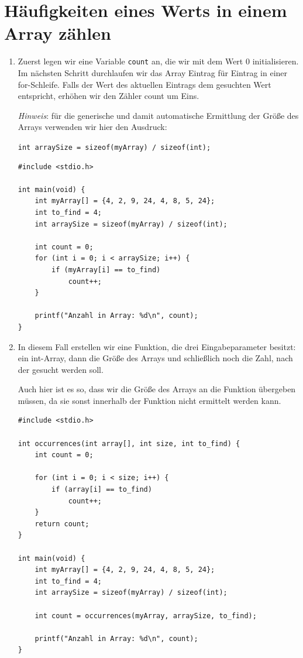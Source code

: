 \chapter{Häufigkeiten eines Werts in einem Array zählen}

\begin{enumerate}
\item Zuerst legen wir eine Variable \texttt{count} an, die wir mit dem
Wert 0 initialisieren. Im nächsten Schritt durchlaufen wir das Array Eintrag
für Eintrag in einer for-Schleife. Falls der Wert des aktuellen Eintrags dem
gesuchten Wert entspricht, erhöhen wir den Zähler count um Eins.

\textit{Hinweis}: für die generische und damit automatische Ermittlung der
Größe des Arrays verwenden wir hier den Ausdruck:

\noindent\texttt{int arraySize = sizeof(myArray) / sizeof(int);}

\begin{verbatim}
#include <stdio.h>

int main(void) {
    int myArray[] = {4, 2, 9, 24, 4, 8, 5, 24};
    int to_find = 4;
    int arraySize = sizeof(myArray) / sizeof(int);

    int count = 0;
    for (int i = 0; i < arraySize; i++) {
        if (myArray[i] == to_find)
            count++;
    }

    printf("Anzahl in Array: %d\n", count);
}
\end{verbatim}

\item In diesem Fall erstellen wir eine Funktion, die drei Eingabeparameter
besitzt: ein int-Array, dann die Größe des Arrays und schließlich noch die
Zahl, nach der gesucht werden soll.

Auch hier ist es so, dass wir die Größe des Arrays an die Funktion übergeben
müssen, da sie sonst innerhalb der Funktion nicht ermittelt werden kann.

\begin{verbatim}
#include <stdio.h>

int occurrences(int array[], int size, int to_find) {
    int count = 0;

    for (int i = 0; i < size; i++) {
        if (array[i] == to_find)
            count++;
    }
    return count;
}

int main(void) {
    int myArray[] = {4, 2, 9, 24, 4, 8, 5, 24};
    int to_find = 4;
    int arraySize = sizeof(myArray) / sizeof(int);

    int count = occurrences(myArray, arraySize, to_find);

    printf("Anzahl in Array: %d\n", count);
}
\end{verbatim}

\end{enumerate}



